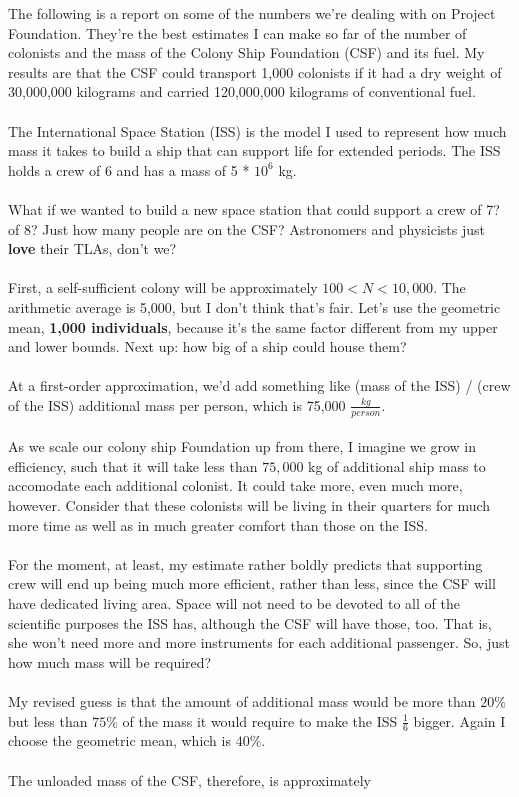 \documentclass[12pt]{article}
\begin{document}
The following is a report on some of the numbers we're dealing with on Project Foundation. They're the best estimates I can make so far of the number of colonists and the mass of the Colony Ship Foundation (CSF) and its fuel. My results are that the CSF could transport 1,000 colonists if it had a dry weight of 30,000,000 kilograms and carried 120,000,000 kilograms of conventional fuel.\\
\\
The International Space Station (ISS) is the model I used to represent how much mass it takes to build a ship that can support life for extended periods. The ISS holds a crew of 6 and has a mass of 5 * $10^6$ kg.\\
\\
What if we wanted to build a new space station that could support a crew of 7? of 8? Just how many people are on the CSF? Astronomers and physicists just \textbf{love} their TLAs, don't we?\\
\\
First, a self-sufficient colony will be approximately $100 < N < 10,000$. The arithmetic average is 5,000, but I don't think that's fair. Let's use the geometric mean, \textbf{1,000 individuals}, because it's the same factor different from my upper and lower bounds. Next up: how big of a ship could house them?\\
\\
At a first-order approximation, we'd add something like (mass of the ISS) / (crew of the ISS) additional mass per person, which is 75,000 $\frac{kg}{person}$.\\
\\
As we scale our colony ship Foundation up from there, I imagine we grow in efficiency, such that it will take less than $75,000$ kg of additional ship mass to accomodate each additional colonist. It could take more, even much more, however. Consider that these colonists will be living in their quarters for much more time as well as in much greater comfort than those on the ISS. \\
\\
For the moment, at least, my estimate rather boldly predicts that supporting crew will end up being much more efficient, rather than less, since the CSF will have dedicated living area. Space will not need to be devoted to all of the scientific purposes the ISS has, although the CSF will have those, too. That is, she won't need more and more instruments for each additional passenger. So, just how much mass will be required?\\
\\
My revised guess is that the amount of additional mass would be more than $20\%$ but less than $75\%$ of the mass it would require to make the ISS $\frac{1}{6}$ bigger. Again I choose the geometric mean, which is $40\%$.\\
\\
The unloaded mass of the CSF, therefore, is approximately 
\end{document}
